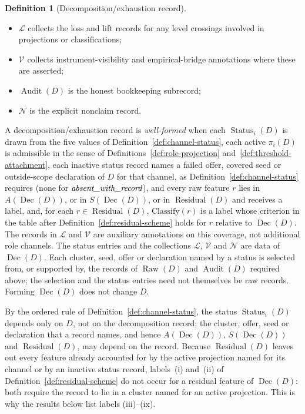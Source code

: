 \documentclass[11pt]{article}
\theoremstyle{definition}
\newtheorem{definition}[theorem]{Definition}
\newcommand{\Raw}[1]{\ensuremath{\operatorname{Raw}\!\left(#1\right)}}
\newcommand{\Audit}[1]{\ensuremath{\operatorname{Audit}\!\left(#1\right)}}
\newcommand{\Dec}[1]{\ensuremath{\operatorname{Dec}\!\left(#1\right)}}
\newcommand{\Residual}[1]{\ensuremath{\operatorname{Residual}\!\left(#1\right)}}
\newcommand{\Status}[2]{\ensuremath{\operatorname{Status}_{#1}\!\left(#2\right)}}
\newcommand{\absentrec}{\textit{absent\_\allowbreak with\_\allowbreak record}}
\begin{document}
\begin{definition}[Decomposition/exhaustion record]
\begin{itemize}[topsep=2pt,itemsep=1pt]
    relative to the chosen record, and \(\mathrm{Classify}\) assigns to each
    \(r \in \Residual{D}\), including any bookkeeping annotation not assigned
    to a channel, a label in the scheme of
    Definition~\ref{def:residual-scheme}; already covered bookkeeping may
    receive (ix);
  \item \(\mathcal{L}\) collects the loss and lift records for any level
    crossings involved in projections or classifications;
  \item \(\mathcal{V}\) collects instrument-visibility and
    empirical-bridge annotations where these are asserted;
  \item \(\Audit{D}\) is the honest bookkeeping subrecord;
  \item \(\mathcal{N}\) is the explicit nonclaim record.
\end{itemize}
A decomposition/exhaustion record is \emph{well-formed} when each
\(\Status{i}{D}\) is drawn from the five values of
Definition~\ref{def:channel-status}, each active
\(\pi_i(D)\) is admissible in the sense of
Definitions~\ref{def:role-projection} and~\ref{def:threshold-attachment},
each inactive status record names a failed offer, covered seed or
outside-scope declaration of \(D\) for that channel, as
Definition~\ref{def:channel-status} requires (none for \(\absentrec\)), and every raw feature \(r\) lies in \(A(\Dec{D})\), or in \(S(\Dec{D})\), or in
\(\Residual{D}\) and receives a label, and, for each
\(r\in\Residual{D}\), \(\mathrm{Classify}(r)\) is a label whose criterion in the
table after Definition~\ref{def:residual-scheme} holds for \(r\) relative to
\(\Dec{D}\). The records in
\(\mathcal{L}\) and \(\mathcal{V}\) are auxiliary annotations on this
coverage, not additional role channels. The status entries and the
collections \(\mathcal{L}\), \(\mathcal{V}\) and \(\mathcal{N}\) are data
of \(\Dec{D}\). Each cluster, seed, offer or declaration named by a status is
selected from, or supported by, the records of \(\Raw{D}\) and \(\Audit{D}\)
required above; the selection and the status entries need not themselves be
raw records. Forming \(\Dec{D}\) does not change \(D\).
\end{definition}

By the ordered rule of Definition~\ref{def:channel-status}, the status
\(\Status{i}{D}\) depends only on \(D\), not on the decomposition record; the
cluster, offer, seed or declaration that a record names, and hence
\(A(\Dec{D})\), \(S(\Dec{D})\) and \(\Residual{D}\), may depend on the record.
Because \(\Residual{D}\) leaves out every feature already accounted for by
the active projection named for its channel or by an inactive status record, labels~(i)
and~(ii) of Definition~\ref{def:residual-scheme} do not occur for a residual
feature of \(\Dec{D}\): both require the record to lie in a cluster named for
an active projection. This is why the results below list labels (iii)--(ix).
\end{document}
